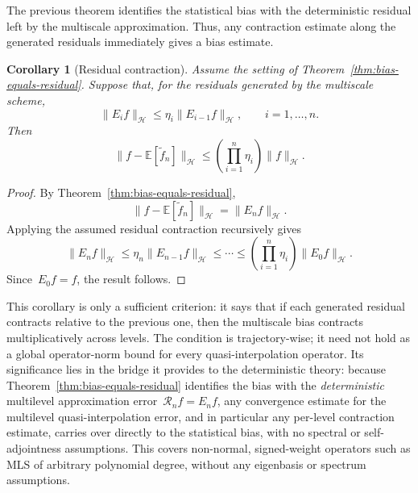 \documentclass[12pt]{article}
\newtheorem{corollary}[theorem]{Corollary}
\newcommand{\E}{{\mathbb{E}}}
\begin{document}
The previous theorem identifies the statistical bias with the deterministic residual left by the multiscale approximation. Thus, any contraction estimate along the generated residuals immediately gives a bias estimate.

\begin{corollary}[Residual contraction]\label{cor:residual-contraction}
Assume the setting of Theorem~\ref{thm:bias-equals-residual}. Suppose that, for the residuals generated by the multiscale scheme,
\[
    \|E_i f\|_{\mathcal H}
    \leq
    \eta_i \|E_{i-1}f\|_{\mathcal H},
    \qquad i=1,\ldots,n.
\]
Then
\[
    \|f-\E[\widetilde f_n]\|_{\mathcal H}
    \leq
    \left(\prod_{i=1}^n \eta_i\right)\|f\|_{\mathcal H}.
\]
\end{corollary}
\begin{proof}
By Theorem~\ref{thm:bias-equals-residual},
\[
    \|f-\E[\widetilde f_n]\|_{\mathcal H}
    =
    \|E_nf\|_{\mathcal H}.
\]
Applying the assumed residual contraction recursively gives
\[
    \|E_nf\|_{\mathcal H}
    \leq
    \eta_n\|E_{n-1}f\|_{\mathcal H}
    \leq \cdots \leq
    \left(\prod_{i=1}^n\eta_i\right)\|E_0f\|_{\mathcal H}.
\]
Since~$E_0f=f$, the result follows.
\end{proof}

This corollary is only a sufficient criterion: it says that if each generated residual contracts relative to the previous one, then the multiscale bias contracts multiplicatively across levels. The condition is trajectory-wise; it need not hold as a global operator-norm bound for every quasi-interpolation operator. Its significance lies in the bridge it provides to the deterministic theory: because Theorem~\ref{thm:bias-equals-residual} identifies the bias with the \emph{deterministic} multilevel approximation error~$\mathcal R_nf=E_nf$, any convergence estimate for the multilevel quasi-interpolation error, and in particular any per-level contraction estimate, carries over directly to the statistical bias, with no spectral or self-adjointness assumptions. This covers non-normal, signed-weight operators such as MLS of arbitrary polynomial degree, without any eigenbasis or spectrum assumptions.
\end{document}
